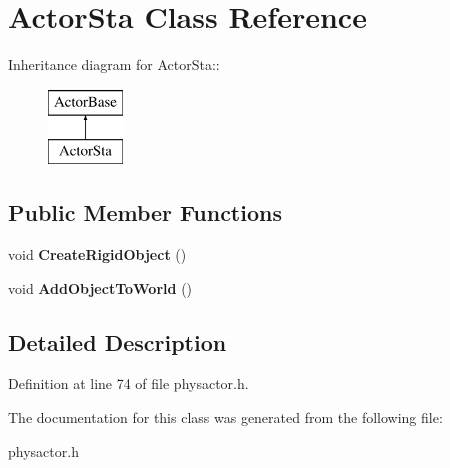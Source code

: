 \hypertarget{classActorSta}{
\section{ActorSta Class Reference}
\label{d3/daf/classActorSta}
}
Inheritance diagram for ActorSta::\begin{figure}[H]
\begin{center}
\leavevmode
\includegraphics[height=2cm]{d3/daf/classActorSta}
\end{center}
\end{figure}
\subsection*{Public Member Functions}
\begin{DoxyCompactItemize}
\item 
\hypertarget{classActorSta_ae856b69de748541606649d21d2e6c270}{
void {\bfseries CreateRigidObject} ()}
\label{d3/daf/classActorSta_ae856b69de748541606649d21d2e6c270}

\item 
\hypertarget{classActorSta_a01a01730ee59fc271095e41674e9cea7}{
void {\bfseries AddObjectToWorld} ()}
\label{d3/daf/classActorSta_a01a01730ee59fc271095e41674e9cea7}

\end{DoxyCompactItemize}


\subsection{Detailed Description}


Definition at line 74 of file physactor.h.

The documentation for this class was generated from the following file:\begin{DoxyCompactItemize}
\item 
physactor.h\end{DoxyCompactItemize}
